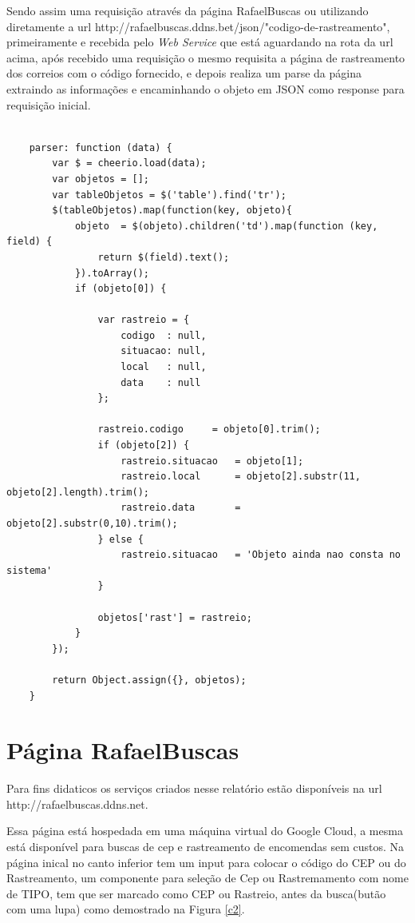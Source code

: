 \documentclass[12pt]{article}
\begin{document}
	Sendo assim uma requisição através da página RafaelBuscas ou utilizando diretamente a url http://rafaelbuscas.ddns.bet/json/"codigo-de-rastreamento", primeiramente e recebida pelo \textit{Web Service} que está aguardando na rota da url acima, após recebido uma requisição o mesmo requisita a página de rastreamento dos correios com o código fornecido, e depois realiza um parse da página extraindo as informações e encaminhando o objeto em JSON como response para requisição inicial.   
	\medskip
	\begin{lstlisting}[caption=Criando um Crawling para parsar as tags,label=c4]
	
	parser: function (data) {
		var $ = cheerio.load(data);
		var objetos = [];
		var tableObjetos = $('table').find('tr');
		$(tableObjetos).map(function(key, objeto){
			objeto  = $(objeto).children('td').map(function (key, field) {
				return $(field).text();
			}).toArray();
			if (objeto[0]) {
				
				var rastreio = {
					codigo  : null,
					situacao: null,
					local   : null,
					data    : null
				};
				
				rastreio.codigo     = objeto[0].trim();
				if (objeto[2]) {
					rastreio.situacao   = objeto[1];
					rastreio.local      = objeto[2].substr(11, objeto[2].length).trim();
					rastreio.data       = objeto[2].substr(0,10).trim();
				} else {
					rastreio.situacao   = 'Objeto ainda nao consta no sistema'
				}
				
				objetos['rast'] = rastreio;
			}
		});
		
		return Object.assign({}, objetos);
	}
	  	\end{lstlisting}
	  	
	  	
	  	\section{Página RafaelBuscas}
	  	Para fins didaticos os serviços criados nesse relatório estão disponíveis na url http://rafaelbuscas.ddns.net.
	  	
	  	Essa página está hospedada em uma máquina virtual do Google Cloud, a mesma está disponível para buscas de cep e rastreamento de encomendas sem custos.
	  	Na página inical no canto inferior tem um input para colocar o código do CEP ou do Rastreamento, um componente para seleção de Cep ou Rastremamento com nome de TIPO, tem que ser marcado como CEP ou Rastreio, antes da busca(butão com uma lupa) como demostrado na Figura \ref{c2}.
	  	
\end{document}

